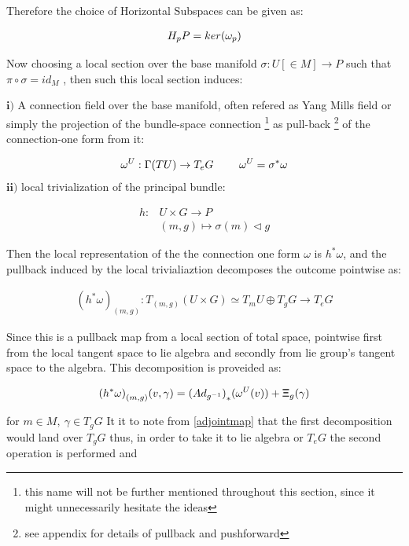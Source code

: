 \documentclass[8pt, twocoloumn]{article}
\begin{document}
Therefore the choice of Horizontal Subspaces can be given as: 

\begin{align} {\label{jsafidsf}}
H_pP = ker(\omega_p)
\end{align}

Now choosing a local section over the base manifold $\sigma : U [\in M ]\to P$ such that $\pi \circ \sigma = id_M$ , then such this local section induces:

$\textbf{i)}$ A connection field over the base manifold, often refered as Yang Mills field or simply the projection of the bundle-space connection \footnote{this name will not be further mentioned throughout this section, since it might unnecessarily hesitate the ideas} as pull-back \footnote{see appendix for details of pullback and pushforward} of the connection-one form from it:

\begin{align}{\label{localconnectiononeform}}
 \omega^{U}: \Gamma(TU) \to T_eG  \ \ \ \ \ \ \ \omega^{U} = \sigma^{*} \omega
\end{align}
$\textbf{ii)}$ local trivialization of the principal bundle:

\begin{align}
h:& U \times G \to P \\ 
& (m, g) \mapsto \sigma(m) \vartriangleleft g 
\end{align}

Then the local representation of the the connection one form $\omega$ is $h^{*}\omega$, and the pullback induced by the local trivialiaztion decomposes the outcome pointwise as:

\begin{align}
    {(h^{*}\omega)}_{(m,g)}: T_{(m,g)}(U \times G) \simeq T_mU \oplus T_gG \to T_eG
\end{align}

Since this is a pullback map from a local section of total space, pointwise first from the local tangent space to lie algebra and secondly from lie group's tangent space to the algebra. This decomposition is proveided as:

\begin{align} {\label{veryimafs}}
     {(h^{*}\omega)}_{(m,g)}(v, \gamma) = {(Ad_{g^{-1}})}_{*}(\omega^{U}(v)) + \mathsf{\Xi}_{g}(\gamma)
\end{align}

for $m \in M, \ \gamma \in T_gG $
 It it to note from \ref{adjointmap} that the first decomposition would land over $T_gG$ thus, in order to take it to lie algebra or $T_eG$ the second operation is performed and 
 
\end{document}
